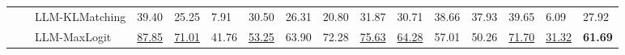 \begin{table}[ht!]
\begin{tabularx}{\textwidth}{@{}l l l |l *{11}{Y}|Y@{}}
 &  & LLM-KLMatching & 39.40 & 25.25 & 7.91 & 30.50 & 26.31 & 20.80 & 31.87 & 30.71 & 38.66 & 37.93 & 39.65 & 6.09 & 27.92 \\
 &  & LLM-MaxLogit & \underline{87.85} & \underline{71.01} & 41.76 & \underline{53.25} & 63.90 & 72.28 & \underline{75.63} & \underline{64.28} & 57.01 & 50.26 & \underline{71.70} & \underline{31.32} & \textbf{61.69} \\
\bottomrule
\end{tabularx}
\label{table::openset_LCR0.5}
\end{table}